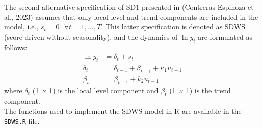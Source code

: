 The second alternative specification of SD1 presented in (Contreras-Espinoza et al., 2023) assumes that only local-level and trend components are included in the model, i.e., $s_t = 0 \ \ \ \forall t = 1, \dots, T$. This latter specification is denoted as SDWS (score-driven without seasonality), and the dynamics of $\ln y_t$ are formulated as follows:
\begin{align*}
    \ln y_t & = \delta_t + s_t \\
    \delta_t &= \delta_{t-1} + \beta_{t-1} + \kappa_1 u_{t-1} \label{eq:SD1_1}\\
    \beta_t &= \beta_{t-1} + k_2 u_{t-1}
\end{align*}
where $\delta_t$ (1 \emph{×} 1) is the local level component and $\beta_t$ (1 \emph{×} 1) is the trend component. \\

The functions used to implement the SDWS model in R are available in the \texttt{SDWS.R} file. 
